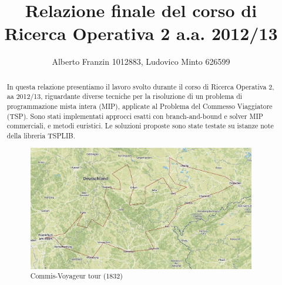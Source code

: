 \documentclass[a4paper,11pt]{report}
\author{Alberto Franzin 1012883, Ludovico Minto 626599}
\title{Relazione finale del corso di Ricerca Operativa 2 a.a. 2012/13}
\begin{document}
\maketitle

\begin{abstract}
In questa relazione presentiamo il lavoro svolto durante il corso di Ricerca Operativa 2, aa 2012/13, riguardante diverse tecniche per la risoluzione di un problema di programmazione mista intera (MIP), applicate al Problema del Commesso Viaggiatore (TSP). Sono stati implementati approcci esatti con branch-and-bound e solver MIP commerciali, e metodi euristici. Le soluzioni proposte sono state testate su istanze note della libreria TSPLIB.

\begin{figure}
  \begin{center}
    \includegraphics[width=\textwidth]{images/commisvoyageur}
    \caption{Commis-Voyageur tour (1832)}
    \label{fig:}
  \end{center}
\end{figure}
\end{abstract}

\tableofcontents









\end{document}
